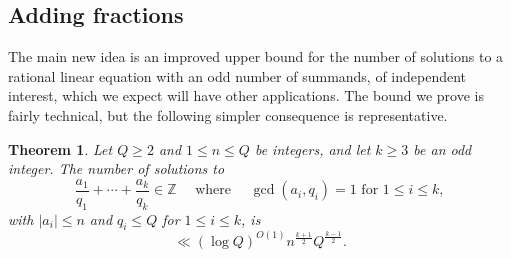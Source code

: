 \documentclass[11pt,letterpaper]{amsart}
\newcommand{\bbz}{\mathbb{Z}}
\newcommand{\abs}[1]{\left\lvert #1\right\rvert}
\newcommand{\ogcd}[2]{\gcd(#1,#2)}
\newtheorem{theorem}{Theorem}
\theoremstyle{definition}
\begin{document}
\subsection{Adding fractions}
The main new idea is an improved upper bound for the number of solutions to a rational linear equation with an odd number of summands, of independent interest, which we expect will have other applications. The bound we prove is fairly technical, but the following simpler consequence is representative.

\begin{theorem}\label{th-simpfrac}
Let $Q \ge 2$ and $1\leq n\leq Q$ be integers, and let $k\geq 3$ be an odd integer. The number of solutions to 
\[\frac{a_1}{q_1}+\cdots+\frac{a_{k}}{q_{k}}\in \bbz\quad\textrm{ where }\quad\ogcd{a_i}{q_i}=1\textrm{ for }1\leq i\leq k,\] 
with $\abs{a_i}\leq n$ and $q_i\leq Q$ for $1\leq i\leq k$, is
\[\ll (\log Q)^{O(1)} n^{\frac{k+1}{2}}Q^{\frac{k-1}{2}}.\]
\end{theorem}
\end{document}
